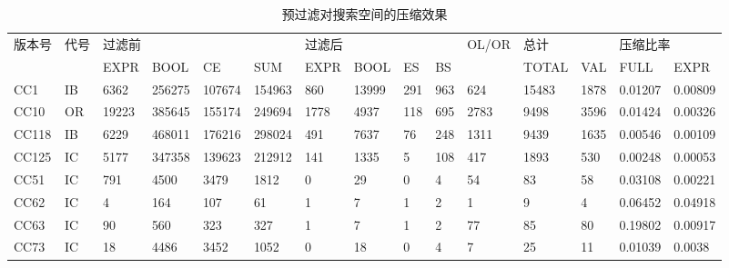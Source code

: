 \begin{landscape}
\begin{table}[]
	\centering
	\caption{预过滤对搜索空间的压缩效果}
	\label{tab:pf effect}
	\begin{tabular}{|l|l|l|l|l|l|l|l|l|l|l|l|l|l|l|}
		\hline
		\multirow{2}{*}{版本号} & \multirow{2}{*}{代号} & \multicolumn{4}{l|}{过滤前}         & \multicolumn{4}{l|}{过滤后} & \multirow{2}{*}{OL/OR} & \multicolumn{2}{l|}{总计} & \multicolumn{2}{l|}{压缩比率} \\ \cline{3-10} \cline{12-15} 
		&                     & EXPR  & BOOL   & CE     & SUM    & EXPR  & BOOL  & ES  & BS  &                         & TOTAL        & VAL         & FULL            & EXPR           \\ \hline
		CC1          &       IB              & 6362  & 256275 & 107674 & 154963 & 860   & 13999 & 291 & 963 & 624                     & 15483        & 1878        & 0.01207         & 0.00809        \\ \hline
		CC10         &       OR              & 19223 & 385645 & 155174 & 249694 & 1778  & 4937  & 118 & 695 & 2783                    & 9498         & 3596        & 0.01424         & 0.00326        \\ \hline
		CC118        &       IB              & 6229  & 468011 & 176216 & 298024 & 491   & 7637  & 76  & 248 & 1311                    & 9439         & 1635        & 0.00546         & 0.00109        \\ \hline
		CC125        &       IC              & 5177  & 347358 & 139623 & 212912 & 141   & 1335  & 5   & 108 & 417                     & 1893         & 530         & 0.00248         & 0.00053        \\ \hline
		CC51         &       IC              & 791   & 4500   & 3479   & 1812   & 0     & 29    & 0   & 4   & 54                      & 83           & 58          & 0.03108         & 0.00221        \\ \hline
		CC62         &       IC              & 4     & 164    & 107    & 61     & 1     & 7     & 1   & 2   & 1                       & 9            & 4           & 0.06452         & 0.04918        \\ \hline
		CC63         &       IC              & 90    & 560    & 323    & 327    & 1     & 7     & 1   & 2   & 77                      & 85           & 80          & 0.19802         & 0.00917        \\ \hline
		CC73         &       IC              & 18    & 4486   & 3452   & 1052   & 0     & 18    & 0   & 4   & 7                       & 25           & 11          & 0.01039         & 0.0038         \\ \hline

\end{tabular}
\end{table}
\end{landscape}
